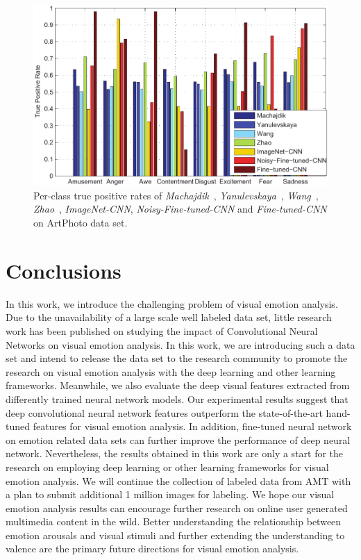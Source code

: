 \documentclass[letterpaper]{article}
\begin{document}
\begin{figure}[!t]
\begin{center}
\includegraphics[width=.45\textwidth]{./artphoto_new-crop}
\end{center}
\caption{Per-class true positive rates of \textit{Machajdik}~\cite{machajdik2010affective}, \textit{Yanulevskaya}~\cite{yanulevskaya2008emotional}, \textit{Wang}~\cite{wei2006image}, \textit{Zhao}~\cite{zhou2014learning}, \textit{ImageNet-CNN}, \textit{Noisy-Fine-tuned-CNN} and \textit{Fine-tuned-CNN} on ArtPhoto data set.}
\label{fig:artphoto}
\end{figure}

\section{Conclusions}
\label{sec:conclusion}
In this work, we introduce the challenging problem of visual emotion analysis. Due to the unavailability of a large scale well labeled data set, little research work has been published on studying the impact of Convolutional Neural Networks on visual emotion analysis. In this work, we are introducing such a data set and intend to release the data set to the research community to promote the research on visual emotion analysis with the deep learning and other learning frameworks. Meanwhile, we also evaluate the deep visual features extracted from differently trained neural network models. Our experimental results suggest that deep convolutional neural network features outperform the state-of-the-art hand-tuned features for visual emotion analysis. In addition, fine-tuned neural network on emotion related data sets can further improve the performance of deep neural network. Nevertheless, the results obtained in this work are only a start for the research on employing deep learning or other learning frameworks for visual emotion analysis. We will continue the collection of labeled data from AMT with a plan to submit additional 1 million images for labeling. We hope our visual emotion analysis results can encourage further research on online user generated multimedia content in the wild. Better understanding the relationship between emotion arousals and visual stimuli and further extending the understanding to valence are the primary future directions for visual emotion analysis.
\end{document}
